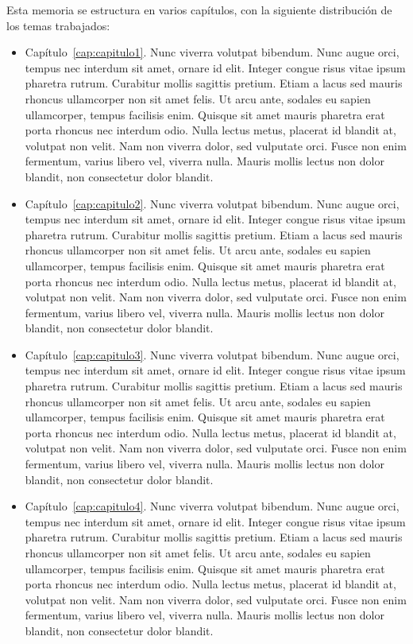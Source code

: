 Esta memoria se estructura en varios capítulos, con la siguiente distribución de los temas trabajados:

\begin{itemize}
	\item Capítulo~\ref{cap:capitulo1}. Nunc viverra volutpat bibendum. Nunc augue orci, tempus nec interdum sit amet, ornare id elit. Integer congue risus vitae ipsum pharetra rutrum. Curabitur mollis sagittis pretium. Etiam a lacus sed mauris rhoncus ullamcorper non sit amet felis. Ut arcu ante, sodales eu sapien ullamcorper, tempus facilisis enim. Quisque sit amet mauris pharetra erat porta rhoncus nec interdum odio. Nulla lectus metus, placerat id blandit at, volutpat non velit. Nam non viverra dolor, sed vulputate orci. Fusce non enim fermentum, varius libero vel, viverra nulla. Mauris mollis lectus non dolor blandit, non consectetur dolor blandit.
	\item Capítulo~\ref{cap:capitulo2}. Nunc viverra volutpat bibendum. Nunc augue orci, tempus nec interdum sit amet, ornare id elit. Integer congue risus vitae ipsum pharetra rutrum. Curabitur mollis sagittis pretium. Etiam a lacus sed mauris rhoncus ullamcorper non sit amet felis. Ut arcu ante, sodales eu sapien ullamcorper, tempus facilisis enim. Quisque sit amet mauris pharetra erat porta rhoncus nec interdum odio. Nulla lectus metus, placerat id blandit at, volutpat non velit. Nam non viverra dolor, sed vulputate orci. Fusce non enim fermentum, varius libero vel, viverra nulla. Mauris mollis lectus non dolor blandit, non consectetur dolor blandit.
	\item Capítulo~\ref{cap:capitulo3}. Nunc viverra volutpat bibendum. Nunc augue orci, tempus nec interdum sit amet, ornare id elit. Integer congue risus vitae ipsum pharetra rutrum. Curabitur mollis sagittis pretium. Etiam a lacus sed mauris rhoncus ullamcorper non sit amet felis. Ut arcu ante, sodales eu sapien ullamcorper, tempus facilisis enim. Quisque sit amet mauris pharetra erat porta rhoncus nec interdum odio. Nulla lectus metus, placerat id blandit at, volutpat non velit. Nam non viverra dolor, sed vulputate orci. Fusce non enim fermentum, varius libero vel, viverra nulla. Mauris mollis lectus non dolor blandit, non consectetur dolor blandit.
	\item Capítulo~\ref{cap:capitulo4}. Nunc viverra volutpat bibendum. Nunc augue orci, tempus nec interdum sit amet, ornare id elit. Integer congue risus vitae ipsum pharetra rutrum. Curabitur mollis sagittis pretium. Etiam a lacus sed mauris rhoncus ullamcorper non sit amet felis. Ut arcu ante, sodales eu sapien ullamcorper, tempus facilisis enim. Quisque sit amet mauris pharetra erat porta rhoncus nec interdum odio. Nulla lectus metus, placerat id blandit at, volutpat non velit. Nam non viverra dolor, sed vulputate orci. Fusce non enim fermentum, varius libero vel, viverra nulla. Mauris mollis lectus non dolor blandit, non consectetur dolor blandit.

\end{itemize}
